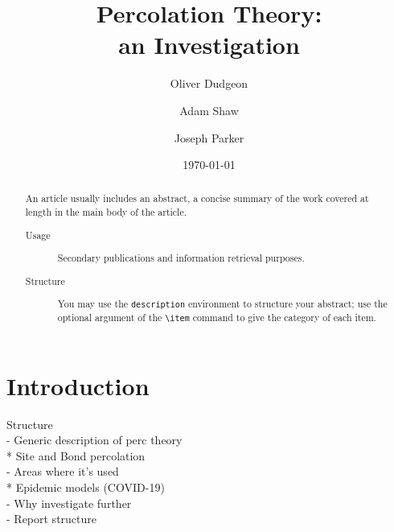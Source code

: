 \documentclass[%
 reprint,
 amsmath,amssymb,
 aps,
]{revtex4-2}
\begin{document}

\title{Percolation Theory:\\an Investigation}%

\author{Oliver Dudgeon}
\author{Adam Shaw}
\author{Joseph Parker}

\date{\today}

\begin{abstract}
An article usually includes an abstract, a concise summary of the work
covered at length in the main body of the article. 
\begin{description}
\item[Usage]
Secondary publications and information retrieval purposes.
\item[Structure]
You may use the \texttt{description} environment to structure your abstract;
use the optional argument of the \verb+\item+ command to give the category of each item. 
\end{description}
\end{abstract}

\maketitle

\section{Introduction}
Structure\\
- Generic description of perc theory\\
* Site and Bond percolation\\
- Areas where it's used\\
    * Epidemic models (COVID-19)\\
- Why investigate further\\
- Report structure\\
\end{document}
